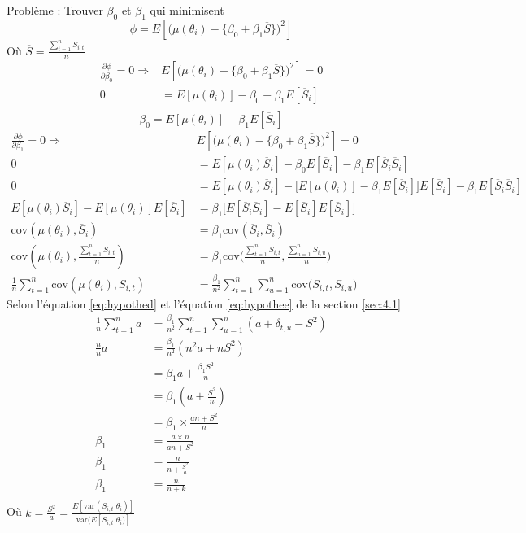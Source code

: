 \documentclass[11pt,french]{report}
\begin{document}
Problème : Trouver  $\beta_0 $ et $\beta_1$ qui minimisent $$\phi = E[\big( \mu(\theta_i) - \lbrace\beta_0 + \beta_1 \overline{S}\rbrace \big)^2]$$
Où $\overline{S} = \frac{\sum_{t=1}^{n} S_{i,t}}{n}$
\begin{align*}
\frac{\partial \phi}{\partial \beta_0} = 0 \Rightarrow &  E[\big( \mu(\theta_i) - \lbrace\beta_0 + \beta_1 \overline{S}\rbrace \big)^2] = 0 \\
0 &= E[\mu(\theta_i)] - \beta_0 - \beta_1 E[\overline{S}_i]\\
\end{align*}
\begin{equation}
\beta_0 = E[\mu(\theta_i)] - \beta_1 E[\overline{S}_i]
\end{equation}
\begin{align*}
\frac{\partial \phi}{\partial \beta_1} = 0 \Rightarrow &  E[\big( \mu(\theta_i) - \lbrace\beta_0 + \beta_1 \overline{S}\rbrace \big)^2] = 0 \\
0 &= E[\mu(\theta_i)\overline{S}_i] - \beta_0E[\overline{S}_i] - \beta_1 E[\overline{S}_i\overline{S}_i]\\
0 &= E[\mu(\theta_i)\overline{S}_i] - \Big[E[\mu(\theta_i)] - \beta_1 E[\overline{S}_i] \Big] E[\overline{S}_i] - \beta_1 E[\overline{S}_i\overline{S}_i]\\
E[\mu(\theta_i)\overline{S}_i] - E[\mu(\theta_i)]E[\overline{S}_i] &= \beta_1 \Big[E[\overline{S}_i\overline{S}_i] - E[\overline{S}_i]E[\overline{S}_i] \Big] \\
\text{cov}(\mu(\theta_i), \overline{S}_i) &= \beta_1 \text{cov}( \overline{S}_i, \overline{S}_i) \\
\text{cov}(\mu(\theta_i), \frac{\sum_{t=1}^{n} S_{i,t}}{n}) &= \beta_1 \text{cov}\Bigg( \frac{\sum_{t=1}^{n} S_{i,t}}{n}, \frac{\sum_{u=1}^{n} S_{i,u}}{n}\Bigg) \\
\frac{1}{n} \sum_{t=1}^{n}\text{cov}(\mu(\theta_i),  S_{i,t}) &= \frac{\beta_1}{n^2} \sum_{t=1}^{n}\sum_{u=1}^{n}\text{cov}\Bigg( S_{i,t}, S_{i,u}\Bigg)
\end{align*}
Selon l'équation \ref{eq:hypothed} et l'équation \ref{eq:hypothee} de la section \ref{sec:4.1}
\begin{align*}
\frac{1}{n} \sum_{t=1}^{n} a &= \frac{\beta_1}{n^2} \sum_{t=1}^{n}\sum_{u=1}^{n}(a + \delta_{t,u} - S^2)\\
\frac{n}{n} a &= \frac{\beta_1}{n^2} (n^2a + nS^2)\\
&= \beta_1 a + \frac{\beta_1 S^2}{n}\\
&= \beta_1 (a + \frac{S^2}{n})\\
&= \beta_1 \times \frac{an+ S^2}{n}\\
\beta_1 &=  \frac{a\times n}{an+ S^2}\\
\beta_1 &=  \frac{n}{n+ \frac{S^2}{a}}\\
\beta_1 &=  \frac{n}{n+ k}\\
\end{align*}
Où $k = \frac{S^2}{a} = \frac{E[\text{var}(S_{i,t}|\theta_i)]}{\text{var}(E[S_{i,t}|\theta_i)]}$
\end{document}
